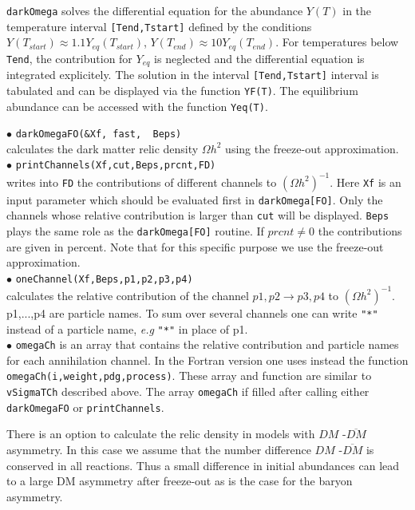 \documentclass[12pt,a4paper]{article}
\begin{document}
\verb|darkOmega| solves the differential equation for the abundance $Y(T)$   in the 
temperature interval {\tt [Tend,Tstart]}  defined by the
conditions $Y(T_{start})\approx 1.1Y_{eq}(T_{start})$,
$Y(T_{end})\approx10Y_{eq}(T_{end})$.  For temperatures below {\tt Tend}, the contribution for  $Y_{eq}$
 is neglected and  the differential equation is integrated
explicitely. The solution in the interval {\tt [Tend,Tstart]}  interval is tabulated and can be displayed  via the
function {\tt YF(T)}. The equilibrium abundance can be accessed  with the function
{\tt Yeq(T)}. 

\noindent
$\bullet$ \verb|darkOmegaFO(&Xf, fast,  Beps)|\\
calculates the  dark matter relic density $\Omega h^2$ using the freeze-out approximation.\\
\noindent
$\bullet$ \verb|printChannels(Xf,cut,Beps,prcnt,FD)|\\   
writes into \verb|FD| the  contributions  of different channels to $(\Omega
h^2)^{-1}$. Here \verb|Xf| is an input parameter which should
be  evaluated first in \verb|darkOmega[FO]|. Only  the channels whose
relative contribution is larger than  \verb|cut| will be displayed. \verb|Beps|
plays the same role as the \verb|darkOmega[FO]| routine.
If $prcnt\ne 0$ the contributions are given in percent.
Note that  for this specific purpose  we use the
freeze-out approximation.\\
$\bullet$ \verb|oneChannel(Xf,Beps,p1,p2,p3,p4)|\\   
calculates the relative   contribution of the  channel $ p1,p2 \to p3,p4$
to $(\Omega h^2)^{-1}$. p1,...,p4 are particle names.  To 
sum over several channels one can write  \verb|"*"| instead 
of  a particle name, {\it e.g} \verb|"*"| in place of p1.\\
\noindent
$\bullet$ \verb|omegaCh| is an array that contains the relative contribution and particle names for each
annihilation channel. In the Fortran version one uses instead
the function\\
\noindent\verb|omegaCh(i,weight,pdg,process)|. These array and function
are similar to {\tt vSigmaTCh} described above. The array {\tt omegaCh} if filled after calling either
{\tt darkOmegaFO} or {\tt printChannels}. 

There is an option to calculate the relic density in  models with  $DM$ -$\overline{DM}$ asymmetry.  
In this case we assume that the  number difference   $DM$ -$\overline{DM}$ is conserved in all reactions.
Thus a small difference in initial abundances can lead to a  large DM asymmetry after freeze-out as is the case for the  baryon
asymmetry.\\
\end{document}
